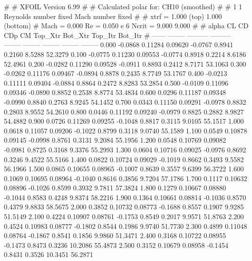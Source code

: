 #  
#       XFOIL         Version 6.99
#  
# Calculated polar for: CH10 (smoothed)                                 
#  
# 1 1 Reynolds number fixed          Mach number fixed         
#  
# xtrf =   1.000 (top)        1.000 (bottom)  
# Mach =   0.000     Re =     0.050 e 6     Ncrit =   9.000  9.000
#  
#   alpha    CL        CD       CDp       CM     Top_Xtr  Bot_Xtr  Top_Itr  Bot_Itr
#  ------ -------- --------- --------- -------- -------- -------- -------- --------
   0.000  -0.0868   0.11284   0.09620  -0.0767   0.8941   0.2160   8.5288  52.3279
   0.100  -0.0775   0.11230   0.09553  -0.0774   0.8918   0.2214   8.6186  52.4961
   0.200  -0.0282   0.11290   0.09528  -0.0911   0.8893   0.2412   8.7171  53.1063
   0.300  -0.0262   0.11176   0.09467  -0.0894   0.8878   0.2435   8.7749  53.1767
   0.400  -0.0213   0.11111   0.09404  -0.0884   0.8864   0.2472   8.8283  53.2854
   0.500  -0.0109   0.11096   0.09346  -0.0890   0.8852   0.2538   8.8774  53.4834
   0.600   0.0296   0.11187   0.09348  -0.0990   0.8840   0.2763   8.9245  54.1452
   0.700   0.0343   0.11150   0.09291  -0.0978   0.8832   0.2803   8.9552  54.2610
   0.800   0.0446   0.11192   0.09240  -0.0979   0.8825   0.2882   8.9827  54.4882
   0.900   0.0726   0.11269   0.09255  -0.1048   0.8817   0.3115   9.0105  55.1517
   1.000   0.0618   0.11057   0.09206  -0.1022   0.8799   0.3118   9.0740  55.1589
   1.100   0.0549   0.10878   0.09145  -0.0998   0.8761   0.3131   9.2084  55.1956
   1.200   0.0548   0.10769   0.09082  -0.0981   0.8725   0.3168   9.3376  55.2993
   1.300   0.0604   0.10716   0.09025  -0.0976   0.8692   0.3246   9.4522  55.5166
   1.400   0.0822   0.10724   0.09029  -0.1019   0.8662   0.3493   9.5582  56.1966
   1.500   0.0865   0.10655   0.08965  -0.1007   0.8639   0.3557   9.6399  56.3722
   1.600   0.1069   0.10695   0.08964  -0.1040   0.8616   0.3856   9.7204  57.1786
   1.700   0.1117   0.10632   0.08896  -0.1026   0.8599   0.3932   9.7811  57.3824
   1.800   0.1279   0.10667   0.08880  -0.1044   0.8583   0.4248   9.8374  58.2216
   1.900   0.1364   0.10661   0.08814  -0.1036   0.8570   0.4379   9.8833  58.5675
   2.000   0.3852   0.10732   0.08773  -0.1688   0.8557   0.1907   9.9285  51.5149
   2.100   0.4224   0.10907   0.08761  -0.1753   0.8549   0.2017   9.9571  51.8763
   2.200   0.4524   0.10983   0.08777  -0.1802   0.8544   0.1986   9.9740  51.7730
   2.300   0.4899   0.11048   0.08764  -0.1867   0.8541   0.1856   9.9860  51.3471
   2.400   0.3168   0.10722   0.08955  -0.1473   0.8473   0.3236  10.2086  55.4873
   2.500   0.3152   0.10679   0.08958  -0.1454   0.8431   0.3526  10.3451  56.2871
